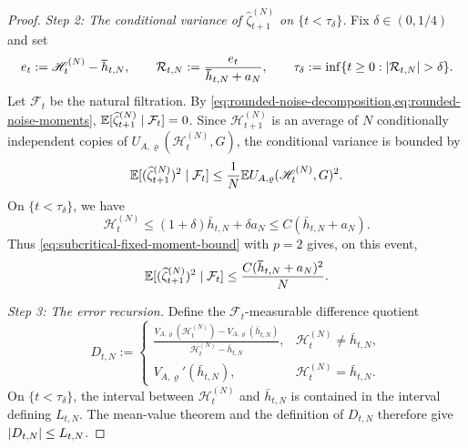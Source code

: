 \documentclass[11pt,reqno,a4paper]{article}
\newcommand{\Ee}{\E}
\begin{document}
\begin{proof}
  \emph{Step 2: The conditional variance of
  $\widehat\zeta_{t+1}^{(N)}$ on $\{t<\tau_\delta\}$.}
  Fix $\delta\in(0,1/4)$ and set
  \begin{equation*}
    e_t:=\mathscr H_t^{(N)}-\bar h_{t,N},
    \qquad
    \mathcal R_{t,N}:=\frac{e_t}{\bar h_{t,N}+a_N},
    \qquad
    \tau_\delta:=\inf\{t\geq0:\abs{\mathcal R_{t,N}}>\delta\}.
  \end{equation*}
  Let $\mathcal F_t$ be the natural filtration. By
  \cref{eq:rounded-noise-decomposition,eq:rounded-noise-moments},
  $\Ee[\widehat\zeta_{t+1}^{(N)}\mid\mathcal F_t]=0$. Since
  $\mathscr H_{t+1}^{(N)}$ is an average of $N$ conditionally independent
  copies of $U_{A,\varrho}(\mathscr H_t^{(N)},G)$, the conditional variance is
  bounded by
  \begin{equation*}
    \Ee[(\widehat\zeta_{t+1}^{(N)})^2\mid\mathcal F_t]
    \leq
    \frac1N
    \Ee U_{A,\varrho}(\mathscr H_t^{(N)},G)^2 .
  \end{equation*}
  On $\{t<\tau_\delta\}$, we have
  \begin{equation*}
    \mathscr H_t^{(N)}
    \leq
    (1+\delta)\bar h_{t,N}+\delta a_N
    \leq
    C(\bar h_{t,N}+a_N).
  \end{equation*}
  Thus \cref{eq:subcritical-fixed-moment-bound} with $p=2$ gives, on this
  event,
  \begin{equation}\label{eq:subcritical-fixed-noise-variance}
    \Ee[(\widehat\zeta_{t+1}^{(N)})^2\mid\mathcal F_t]
    \leq
    \frac{C(\bar h_{t,N}+a_N)^2}{N}.
  \end{equation}

  \emph{Step 3: The error recursion.}
  Define the $\mathcal F_t$-measurable difference quotient
  \begin{equation*}
    D_{t,N}
    :=
    \begin{cases}
      \displaystyle
      \frac{
        V_{A,\varrho}(\mathscr H_t^{(N)})
        -V_{A,\varrho}(\bar h_{t,N})
      }{
        \mathscr H_t^{(N)}-\bar h_{t,N}
      },
      & \mathscr H_t^{(N)}\neq\bar h_{t,N},
      \\[1.2em]
      V_{A,\varrho}'(\bar h_{t,N}),
      & \mathscr H_t^{(N)}=\bar h_{t,N}.
    \end{cases}
  \end{equation*}
  On $\{t<\tau_\delta\}$, the interval between $\mathscr H_t^{(N)}$ and
  $\bar h_{t,N}$ is contained in the interval defining $L_{t,N}$. The
  mean-value theorem and the definition of $D_{t,N}$ therefore give
  $\abs{D_{t,N}}\leq L_{t,N}$.


\end{proof}
\end{document}
